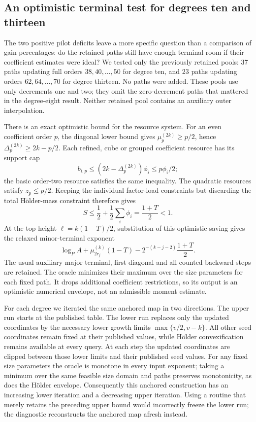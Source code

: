 \documentclass[11pt,letterpaper]{article}
\numberwithin{equation}{section}
\begin{document}
\par\bigskip{}

\subsection{An optimistic terminal test for degrees ten and thirteen}
\label{sec:ideal-terminal-headroom}

The two positive pilot deficits leave a more specific question than a
comparison of gain percentages: do the retained paths still have enough
terminal room if their coefficient estimates were ideal? We tested only the
previously retained pools: 37 paths updating full orders $38,40,\ldots,50$
for degree ten, and 23 paths updating orders $62,64,\ldots,70$ for degree
thirteen. No paths were added. These pools use only decrements one and two;
they omit the zero-decrement paths that mattered in the degree-eight result.
Neither retained pool contains an auxiliary outer interpolation.

There is an exact optimistic bound for the resource system. For an even
coefficient order $p$, the diagonal lower bound gives
$\mu_p^{(2k)}\ge p/2$, hence
$\Delta_p^{(2k)}\ge2k-p/2$. Each refined, cube or grouped coefficient
resource has its support cap
\[
 b_{i,p}\le(2k-\Delta_p^{(2k)})\phi_i\le p\phi_i/2;
\]
the basic order-two resource satisfies the same inequality. The quadratic
resources satisfy $z_p\le p/2$. Keeping the individual factor-load
constraints but discarding the total H\"older-mass constraint therefore gives
\[
 S\le\frac12+\frac12\sum_i\phi_i=\frac{1+T}{2}<1.
\]
At the top height $\ell=k(1-T)/2$, substitution of this optimistic saving
gives the relaxed minor-terminal exponent
\[
 \log_P A+\mu_{2r_j}^{(k)}(1-T)
       -2^{-(k-j-2)}\frac{1+T}{2}.
\]
The usual auxiliary major terminal, first diagonal and all counted backward
steps are retained. The oracle minimizes their maximum over the size
parameters for each fixed path. It drops additional coefficient restrictions,
so its output is an optimistic numerical envelope, not an admissible moment
estimate.

For each degree we iterated the same anchored map in two directions. The
upper run starts at the published table. The lower run replaces only the
updated coordinates by the necessary lower growth limits
$\max\{v/2,v-k\}$. All other seed coordinates remain fixed at their
published values, while H\"older convexification remains available at every
query. At each step the updated coordinates are clipped between those lower
limits and their published seed values. For any fixed size parameters the
oracle is monotone in every input exponent; taking a minimum over the same
feasible size domain and paths preserves monotonicity, as does the H\"older
envelope. Consequently this anchored construction has an increasing lower
iteration and a decreasing upper iteration. Using a routine that merely
retains the preceding upper bound would incorrectly freeze the lower run;
the diagnostic reconstructs the anchored map afresh instead.
\end{document}
